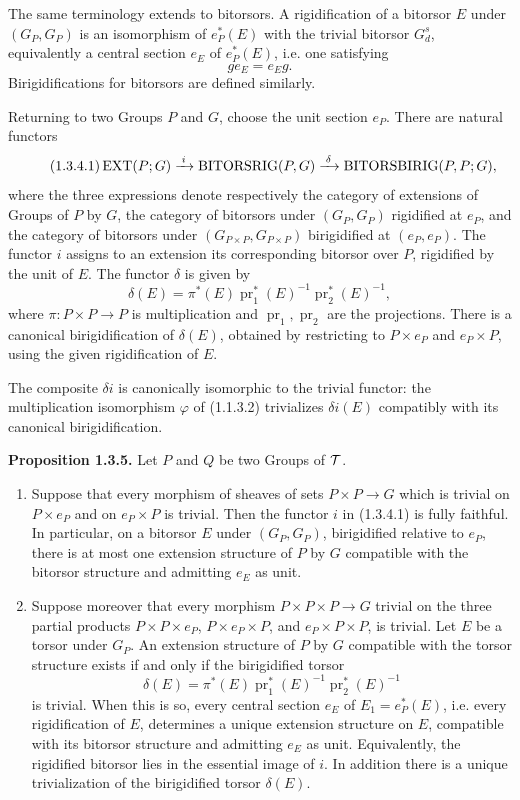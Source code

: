 \documentclass[11pt]{article}
\providecommand{\pr}{\operatorname{pr}}
\begin{document}
The same terminology extends to bitorsors.  A rigidification of a bitorsor \(E\) under \((G_P,G_P)\) is an isomorphism of \(e_P^*(E)\) with the trivial bitorsor \(G_d^s\), equivalently a central section \(e_E\) of \(e_P^*(E)\), i.e. one satisfying
\[
  g e_E=e_E g.
\]
Birigidifications for bitorsors are defined similarly.

Returning to two Groups \(P\) and \(G\), choose the unit section \(e_P\).  There are natural functors
\begin{equation}\tag{1.3.4.1}
  \operatorname{EXT}(P;G)\xrightarrow{\;i\;}\operatorname{BITORSRIG}(P,G)
  \xrightarrow{\;\delta\;}\operatorname{BITORSBIRIG}(P,P;G),
\end{equation}
where the three expressions denote respectively the category of extensions of Groups of \(P\) by \(G\), the category of bitorsors under \((G_P,G_P)\) rigidified at \(e_P\), and the category of bitorsors under \((G_{P\times P},G_{P\times P})\) birigidified at \((e_P,e_P)\).  The functor \(i\) assigns to an extension its corresponding bitorsor over \(P\), rigidified by the unit of \(E\).  The functor \(\delta\) is given by
\begin{equation}\tag{1.3.4.2}
  \delta(E)=\pi^*(E)\pr_1^*(E)^{-1}\pr_2^*(E)^{-1},
\end{equation}
where \(\pi:P\times P\to P\) is multiplication and \(\pr_1,\pr_2\) are the projections.  There is a canonical birigidification of \(\delta(E)\), obtained by restricting to \(P\times e_P\) and \(e_P\times P\), using the given rigidification of \(E\).

The composite \(\delta i\) is canonically isomorphic to the trivial functor: the multiplication isomorphism \(\varphi\) of (1.1.3.2) trivializes \(\delta i(E)\) compatibly with its canonical birigidification.

\textbf{Proposition 1.3.5.}  Let \(P\) and \(Q\) be two Groups of \(\mathcal T\).
\begin{enumerate}[label=\alph*)]
\item Suppose that every morphism of sheaves of sets \(P\times P\to G\) which is trivial on \(P\times e_P\) and on \(e_P\times P\) is trivial.  Then the functor \(i\) in (1.3.4.1) is fully faithful.  In particular, on a bitorsor \(E\) under \((G_P,G_P)\), birigidified relative to \(e_P\), there is at most one extension structure of \(P\) by \(G\) compatible with the bitorsor structure and admitting \(e_E\) as unit.
\item Suppose moreover that every morphism \(P\times P\times P\to G\) trivial on the three partial products \(P\times P\times e_P\), \(P\times e_P\times P\), and \(e_P\times P\times P\), is trivial.  Let \(E\) be a torsor under \(G_P\).  An extension structure of \(P\) by \(G\) compatible with the torsor structure exists if and only if the birigidified torsor
\[
  \delta(E)=\pi^*(E)\pr_1^*(E)^{-1}\pr_2^*(E)^{-1}
\]
is trivial.  When this is so, every central section \(e_E\) of \(E_1=e_P^*(E)\), i.e. every rigidification of \(E\), determines a unique extension structure on \(E\), compatible with its bitorsor structure and admitting \(e_E\) as unit.  Equivalently, the rigidified bitorsor lies in the essential image of \(i\).  In addition there is a unique trivialization of the birigidified torsor \(\delta(E)\).
\end{enumerate}
\end{document}
